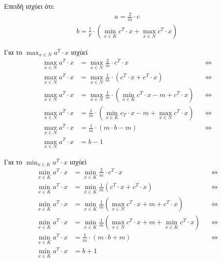 \documentclass[12pt]{article}
\newcommand{\centered}[1]{\begin{align*}#1\end{align*}}
\begin{document}
Επειδή ισχύει ότι: \\

\centered{a = \frac{2}{m} \cdot c}
\centered{b = \frac{1}{p} \cdot \left( \min_{x \in K} c^{T} \cdot x + \max_{x \in N} c^{T} \cdot x \right)}

Για το \(\max_{x \in N} a^{T} \cdot x\) ισχύεί \\

\begin{align*}
\max_{x \in N} a^{T} \cdot x & = \max_{x \in N} \frac{2}{m} \cdot c^{T} \cdot x  && \Leftrightarrow \\ 
\max_{x \in N} a^{T} \cdot x & = \max_{x \in N} \frac{1}{m} \cdot \left( c^{T} \cdot x + c^{T} \cdot x \right) && \Leftrightarrow \\
\max_{x \in N} a^{T} \cdot x & = \max_{x \in N} \frac{1}{m} \cdot \left( \min_{x \in K} c^{T} \cdot x - m + c^{T} \cdot x \right)  && \Leftrightarrow \\
\max_{x \in N} a^{T} \cdot x & = \frac{1}{m} \cdot \left( \min_{x \in K} c_{T} \cdot x - m + \max_{x \in N} c^{T} \cdot x \right)  && \Leftrightarrow \\
\max_{x \in N} a^{T} \cdot x & = \frac{1}{m} \cdot \left( m \cdot b - m \right) && \Leftrightarrow \\ 
\max_{x \in N} a^{T} \cdot x & = b - 1 
\end{align*} 

Για το \(\min_{x \in K} a^{T} \cdot x\) ισχύεί \\

\begin{align*}
\min_{x \in K} a^{T} \cdot x & = \min_{x \in K} \frac{2}{m} \cdot c^{T} \cdot x && \Leftrightarrow \\ 
\min_{x \in K} a^{T} \cdot x & = \min_{x \in K} \frac{1}{m} \left( c^{T} \cdot x + c^{T} \cdot x \right) && \Leftrightarrow \\ 
\min_{x \in K} a^{T} \cdot x & = \min_{x \in K} \frac{1}{m} \left( \max_{x \in N} c^{T} \cdot x + m + c^{T} \cdot x \right) && \Leftrightarrow \\
\min_{x \in K} a^{T} \cdot x & = \min_{x \in K} \frac{1}{m} \left( \max_{x \in N} c^{T} \cdot x + m + \min_{x \in K} c^{T} \cdot x \right) && \Leftrightarrow \\ 
\min_{x \in K} a^{T} \cdot x & = \frac{1}{m} \cdot \left( m \cdot b + m \right) && \Leftrightarrow \\
\min_{x \in K} a^{T} \cdot x & = b + 1
\end{align*} 
\end{document}
